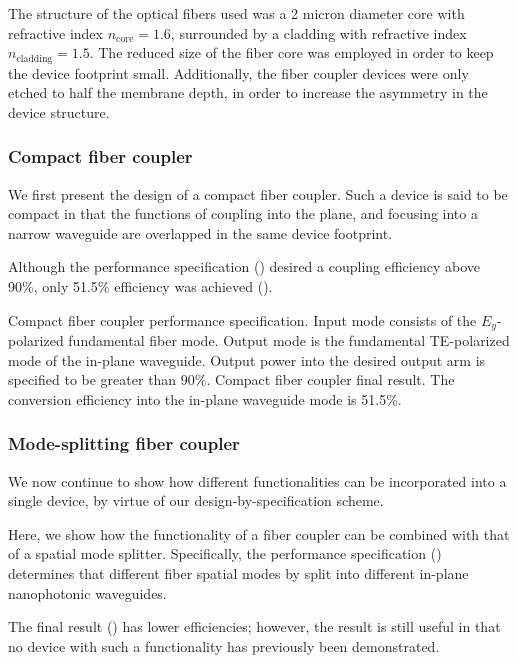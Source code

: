 The structure of the optical fibers used was a 2 micron diameter core with 
    refractive index $n_\text{core} = 1.6$,
    surrounded by a cladding with refractive index $n_\text{cladding}=1.5$.
The reduced size of the fiber core was employed in order
    to keep the device footprint small.
Additionally, the fiber coupler devices were only etched to half the membrane depth,
    in order to increase the asymmetry in the device structure.

\subsubsection{Compact fiber coupler}
We first present the design of a compact fiber coupler.
Such a device is said to be compact in that the functions
    of coupling into the plane, and focusing into a narrow waveguide
    are overlapped in the same device footprint.

Although the performance specification ()
    desired a coupling efficiency above 90\%,
    only 51.5\% efficiency was achieved ().

    {Compact fiber coupler performance specification.
    Input mode consists of the $E_y$-polarized fundamental fiber mode.
    Output mode is the fundamental TE-polarized mode of the in-plane waveguide.
    Output power into the desired output arm is specified to be greater than 90\%.}
    {Compact fiber coupler final result.
    The conversion efficiency into the in-plane waveguide mode is 51.5\%.}

\subsubsection{Mode-splitting fiber coupler}
We now continue to show how different functionalities
    can be incorporated into a single device,
    by virtue of our design-by-specification scheme.

Here, we show how the functionality of a fiber coupler
    can be combined with that of a spatial mode splitter.
Specifically, the performance specification ()
    determines that different fiber spatial modes
    by split into different in-plane nanophotonic waveguides.

The final result () has lower efficiencies;
    however, the result is still useful 
    in that no device with such a functionality has previously been demonstrated.

